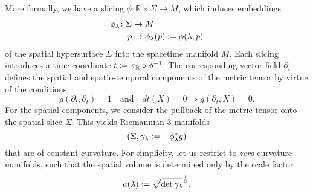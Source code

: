 More formally, we have a slicing $\phi\colon\mathbb R\times\Sigma\rightarrow M$, which induces embeddings
\begin{equation}
  \begin{aligned}
    \phi_\lambda\colon\Sigma\rightarrow {} & M \\
    p \mapsto {} & \phi_\lambda(p) \vcentcolon= \phi(\lambda,p)
  \end{aligned}
\end{equation}
of the spatial hypersurface $\Sigma$ into the spacetime manifold $M$. Each slicing introduces a time coordinate $t \vcentcolon= \pi_{\mathbb R} \circ \phi^{-1}$. The corresponding vector field $\partial_t$ defines the spatial and spatio-temporal components of the metric tensor by virtue of the conditions
\begin{equation}
  g(\partial_t,\partial_t) = 1\quad\text{and}\quad dt(X) = 0\Longrightarrow g(\partial_t,X) = 0.
\end{equation}
For the spatial components, we consider the pullback of the metric tensor onto the spatial slice $\Sigma$. This yields Riemannian 3-manifolds
\begin{equation}
  (\Sigma, \gamma_\lambda \vcentcolon= -\phi_\lambda^\ast g)
\end{equation}
that are of constant curvature. For simplicity, let us restrict to \emph{zero} curvature manifolds, such that the spatial volume is determined only by the scale factor
\begin{equation}
  a(\lambda) \vcentcolon= \sqrt{\operatorname{det} \gamma_\lambda}^\frac{1}{3}.
\end{equation}


